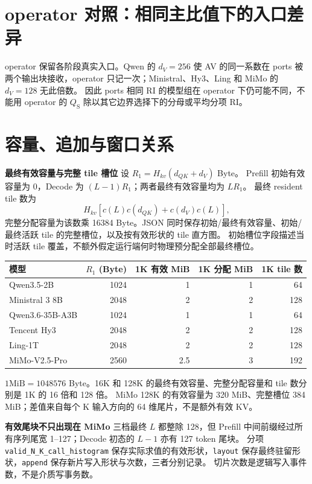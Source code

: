 \documentclass[UTF8,a4paper,11pt]{ctexart}
\newcommand{\qs}{{Q_{\mathrm S}}}\newcommand{\qr}{{Q_{\mathrm R}}}\newcommand{\ri}{\mathrm{RI}}
\newcommand{\para}[1]{\par\textbf{#1}\quad}
\begin{document}
\clearpage
\section{operator 对照：相同主比值下的入口差异}
\begin{center}\small\setlength{\tabcolsep}{12pt}\end{center}
operator 保留各阶段真实入口。Qwen 的 $d_V=256$ 使 AV 的同一系数在 ports 被两个输出块接收，operator 只记一次；Ministral、Hy3、Ling 和 MiMo 的 $d_V=128$ 无此倍数。
因此 ports 相同 RI 的模型组在 operator 下仍可能不同，不能用 operator 的 $\qs$ 除以其它边界选择下的分母或平均分项 RI。

\clearpage
\section{容量、追加与窗口关系}
\para{最终有效容量与完整 tile 槽位} 设 $R_1=H_{kv}(d_{QK}+d_V)$ Byte。
Prefill 初始有效容量为 0，Decode 为 $(L-1)R_1$；两者最终有效容量均为 $LR_1$。
最终 resident tile 数为
\[
H_{kv}[c(L)c(d_{QK})+c(d_V)c(L)],
\]
完整分配容量为该数乘 16384 Byte。JSON 同时保存初始/最终有效容量、初始/最终活跃 tile 的完整槽位，以及按有效形状的 tile 直方图。
初始槽位字段描述当时活跃 tile 覆盖，不额外假定运行端何时物理预分配全部最终槽位。

\begin{center}\small
\begin{tabular}{@{}lrrrr@{}}\toprule
模型 & $R_1$ (Byte) & 1K 有效 MiB & 1K 分配 MiB & 1K tile 数\\\midrule
Qwen3.5-2B & 1024 & 1 & 1 & 64\\
Ministral 3 8B & 2048 & 2 & 2 & 128\\
Qwen3.6-35B-A3B & 1024 & 1 & 1 & 64\\
Tencent Hy3 & 2048 & 2 & 2 & 128\\
Ling-1T & 2048 & 2 & 2 & 128\\
MiMo-V2.5-Pro & 2560 & 2.5 & 3 & 192\\\bottomrule
\end{tabular}\end{center}
$1\mathrm{MiB}=1048576$ Byte。16K 和 128K 的最终有效容量、完整分配容量和 tile 数分别是 1K 的 16 倍和 128 倍。
MiMo 128K 的有效容量为 320 MiB、完整槽位 384 MiB；差值来自每个 K 输入方向的 64 维尾片，不是额外有效 KV。

\para{有效尾块不只出现在 MiMo} 三档最终 $L$ 都整除 128，但 Prefill 中间前缀经过所有序列尾宽 1--127；Decode 初态的 $L-1$ 亦有 127 token 尾块。
分项 \texttt{valid\_N\_K\_call\_histogram} 保存实际求值的有效形状，\texttt{layout} 保存最终驻留形状，\texttt{append} 保存新片写入形状与次数，三者分别记录。
切片次数是逻辑写入事件数，不是介质写事务数。
\end{document}
